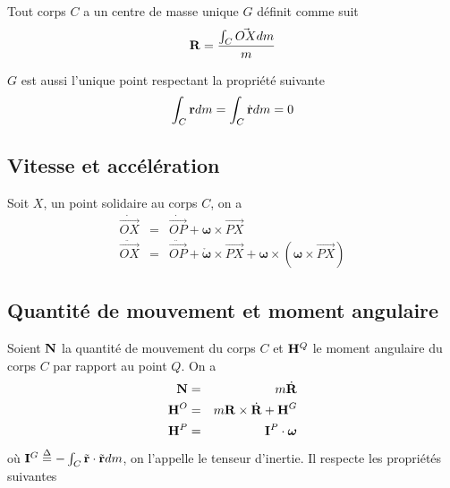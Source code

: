 \documentclass[11pt,a4paper]{article}
\newcommand\fv[1]{{\bf #1}} %
\newcommand\fvd[1]{\dot{\bf #1}} %
\newcommand\eqdef{\stackrel{\Delta}{=}}
\newcommand\omegaf{{\bm \omega}}
\newcommand\omegafr{\mathring{\bm \omega}}
\newcommand\ine{{\bf I}}
\newcommand\lm{{\bf N}}
\newcommand\am{{\bf H}}
\newcommand\xg{\ensuremath{\fv{R}}}
\newcommand\xgd{\ensuremath{\fvd{R}}}
\newcommand\dvec[1]{\dot{\vec{ #1}}}
\newcommand\ddvec[1]{\ddot{\vec{ #1}}}
\begin{document}
Tout corps $C$ a un centre de masse unique $G$ définit comme suit
\[ \xg = \frac{\int_C \vec{OX} dm}{m} \]

$G$ est aussi l'unique point respectant la propriété suivante
\[ \int_C \fv{r} dm = \int_C \fvd{r} dm = 0 \]

\subsection{Vitesse et accélération}
Soit $X$, un point solidaire au corps $C$, on a
\begin{eqnarray*}
	\dvec{OX} &=& \dvec{OP} + \omegaf \times \vec{PX}\\
	\ddvec{OX} &=& \ddvec{OP} + \omegafr \times \vec{PX} + \omegaf \times (\omegaf \times \vec{PX})
\end{eqnarray*}

\subsection{Quantité de mouvement et moment angulaire}
Soient $\lm$ la quantité de mouvement du corps $C$ et $\am^Q$ le moment angulaire du corps $C$ par rapport au point $Q$.
On a
\begin{eqnarray*}
	\lm &=& m \xgd\\
	\am^O &=& m \xg \times \xgd + \am^G\\
	\am^P &=& \ine^P \cdot \omegaf
\end{eqnarray*}
où $\ine^G \eqdef -\int_C \tilde{\fv{r}}\cdot\tilde{\fv{r}} dm$, on l'appelle le tenseur d'inertie.
Il respecte les propriétés suivantes
\end{document}

